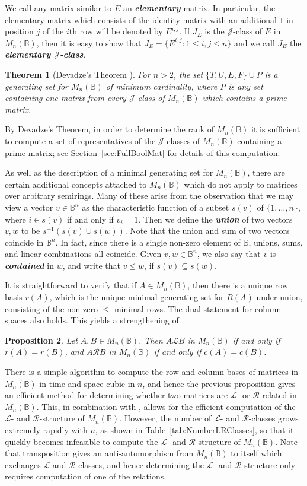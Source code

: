 \documentclass[11pt]{article}
\newtheorem{thm}{Theorem}[section]
\newtheorem{prop}[thm]{Proposition}
\newcommand{\defn}[1]{\textbf{\textit{#1}}}
\numberwithin{equation}{section}
\newcommand{\set}[2]{\ensuremath{\{#1 : #2 \}}}
\newcommand{\B}{\mathbb{B}}
\newcommand{\Bn}{M_n(\B)}
\renewcommand{\L}{\mathscr{L}}
\newcommand{\R}{\mathscr{R}}
\newcommand{\J}{\mathscr{J}}
\begin{document}
We call any matrix similar to $E$ an \defn{elementary} matrix. In particular,
the elementary matrix which consists of the identity matrix with an additional
$1$ in position $j$ of the $i$th row will be denoted by $E^{i,j}$. If $J_E$ is
the $\J$-class of $E$ in $\Bn$, then it is easy to show that $J_E =
\set{E^{i,j}}{1 \leq i, j \leq n}$ and we call $J_E$ the \defn{elementary
  $\J$-class}. 
\begin{thm}[Devadze's Theorem \cite{Konieczny2011aa}]
  For $n > 2$, the set $\{T, U, E, F\} \cup P$ is a generating set for $\Bn$ of
  minimum cardinality, where $P$ is any set containing one matrix from every
  $\J$-class of $\Bn$ which contains a prime matrix. 
\end{thm}
By Devadze's Theorem, in order to determine the rank of $\Bn$ it is sufficient
to compute a set of representatives of the $\J$-classes of $\Bn$ containing a
prime matrix; see Section~\ref{sec:FullBoolMat} for details of this computation.

As well as the description of a minimal generating set for $\Bn$, there are
certain additional concepts attached to $\Bn$ which do not apply to matrices
over arbitrary semirings. Many of these arise from the observation that we may
view a vector $v \in \B^n$ as the characteristic function of a subset $s(v)$ of
$\{1, \ldots, n\}$, where $i \in s(v)$ if and only if $v_i = 1$.  Then we define
the \defn{union} of two vectors $v, w$ to be $s^{-1}(s(v) \cup s(w))$. Note that
the union and sum of two vectors coincide in $\B^n$. In fact, since there is a
single non-zero element of $\B$, unions, sums, and linear combinations all
coincide. Given $v, w \in \B^n$, we also say that $v$ is \defn{contained} in
$w$, and write that $v \leq w$, if $s(v) \subseteq s(w)$.

It is straightforward to verify that if $A \in \Bn$, then there is a unique row
basis $r(A)$, which is the unique minimal generating set for $R(A)$ under union,
consisting of the non-zero $\leq$-minimal rows. The dual statement for column
spaces also holds. This yields a strengthening of
.

\begin{prop} 
  Let $A, B \in \Bn$. Then $A \L B$ in $\Bn$ if and only if $r(A) = r(B)$,
  and $A \R B$ in $\Bn$ if and only if $c(A) = c(B)$.
\end{prop}
There is a simple algorithm to compute the row and column bases of matrices in
$\Bn$ in time and space cubic in $n$, and hence the previous proposition gives
an efficient method for determining whether two matrices are $\L$- or
$\R$-related in $\Bn$. This, in combination with
, allows for the efficient computation of the
$\L$- and $\R$-structure of $\Bn$. However, the number of $\L$- and $\R$-classes
grows extremely rapidly with $n$, as shown in Table~\ref{tab:NumberLRClasses},
so that it quickly becomes infeasible to compute the $\L$- and $\R$-structure of
$\Bn$. Note that transposition gives an anti-automorphism from $\Bn$ to itself
which exchanges $\L$ and $\R$ classes, and hence determining the $\L$- and
$\R$-structure only requires computation of one of the relations.
\end{document}
